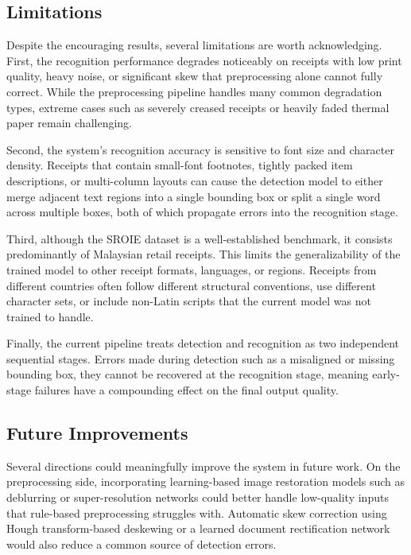 \subsection{Limitations}

Despite the encouraging results, several limitations are worth acknowledging. First, the
recognition performance degrades noticeably on receipts with low print quality, heavy noise, or
significant skew that preprocessing alone cannot fully correct. While the preprocessing pipeline
handles many common degradation types, extreme cases such as severely creased receipts or
heavily faded thermal paper remain challenging.

Second, the system's recognition accuracy is sensitive to font size and character density.
Receipts that contain small-font footnotes, tightly packed item descriptions, or multi-column
layouts can cause the detection model to either merge adjacent text regions into a single
bounding box or split a single word across multiple boxes, both of which propagate errors into
the recognition stage.

Third, although the SROIE dataset is a well-established benchmark, it consists predominantly
of Malaysian retail receipts. This limits the generalizability of the trained model to other
receipt formats, languages, or regions. Receipts from different countries often follow
different structural conventions, use different character sets, or include non-Latin scripts
that the current model was not trained to handle.

Finally, the current pipeline treats detection and recognition as two independent sequential
stages. Errors made during detection such as a misaligned or missing bounding box, they cannot
be recovered at the recognition stage, meaning early-stage failures have a compounding effect
on the final output quality.

\subsection{Future Improvements}

Several directions could meaningfully improve the system in future work. On the preprocessing
side, incorporating learning-based image restoration models such as deblurring or
super-resolution networks could better handle low-quality inputs that rule-based preprocessing
struggles with. Automatic skew correction using Hough transform-based deskewing or a learned
document rectification network would also reduce a common source of detection errors.


